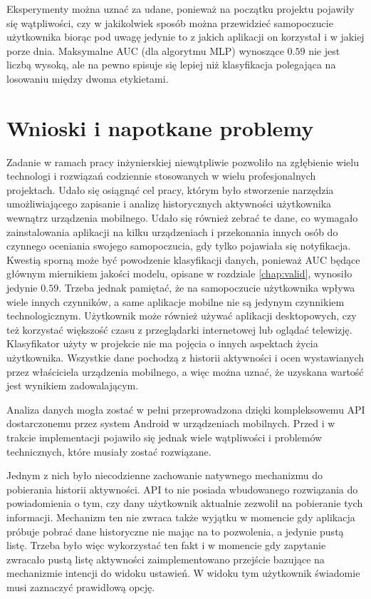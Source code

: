 \documentclass[a4paper,twoside,12pt]{book}
\begin{document}
Eksperymenty można uznać za udane, ponieważ na początku projektu pojawiły się wątpliwości, czy w jakikolwiek sposób można przewidzieć samopoczucie użytkownika biorąc pod uwagę jedynie to z jakich aplikacji on korzystał i w jakiej porze dnia. Maksymalne AUC (dla algorytmu MLP) wynoszące $0.59$ nie jest liczbą wysoką, ale na pewno spisuje się lepiej niż klasyfikacja polegająca na losowaniu między dwoma etykietami.  


\chapter{Wnioski i napotkane problemy}
\label{chap:conc}
Zadanie w ramach pracy inżynierskiej niewątpliwie pozwoliło na zgłębienie wielu technologi i rozwiązań codziennie stosowanych w wielu profesjonalnych projektach. Udało się osiągnąć cel pracy, którym było stworzenie narzędzia umożliwiającego zapisanie i analizę historycznych aktywności użytkownika wewnątrz urządzenia mobilnego. Udało się również zebrać te dane, co wymagało zainstalowania aplikacji na kilku urządzeniach i przekonania innych osób do czynnego oceniania swojego samopoczucia, gdy tylko pojawiała się notyfikacja. Kwestią sporną może być powodzenie klasyfikacji danych, ponieważ AUC będące głównym miernikiem jakości modelu, opisane w rozdziale \ref{chap:valid}, wynosiło jedynie $0.59$. Trzeba jednak pamiętać, że na samopoczucie użytkownika wpływa wiele innych czynników, a same aplikacje mobilne nie są jedynym czynnikiem technologicznym. Użytkownik może również używać aplikacji desktopowych, czy też korzystać większość czasu z przeglądarki internetowej lub oglądać telewizję. Klasyfikator użyty w projekcie nie ma pojęcia o innych aspektach życia użytkownika. Wszystkie dane pochodzą z historii aktywności i ocen wystawianych przez właściciela urządzenia mobilnego, a więc można uznać, że uzyskana wartość jest wynikiem zadowalającym.

Analiza danych mogła zostać w pełni przeprowadzona dzięki kompleksowemu API dostarczonemu przez system Android w urządzeniach mobilnych. Przed i w trakcie implementacji pojawiło się jednak wiele wątpliwości i problemów technicznych, które musiały zostać rozwiązane. 

Jednym z nich było niecodzienne zachowanie natywnego mechanizmu do pobierania historii aktywności. API to nie posiada wbudowanego rozwiązania do powiadomienia o tym, czy dany użytkownik aktualnie zezwolił na pobieranie tych informacji. Mechanizm ten nie zwraca także wyjątku w momencie gdy aplikacja próbuje pobrać dane historyczne nie mając na to pozwolenia, a jedynie pustą listę. Trzeba było więc wykorzystać ten fakt i w momencie gdy zapytanie zwracało pustą listę aktywności zaimplementowano przejście bazujące na mechanizmie intencji do widoku ustawień. W widoku tym użytkownik świadomie musi zaznaczyć prawidłową opcję. 
\end{document}
